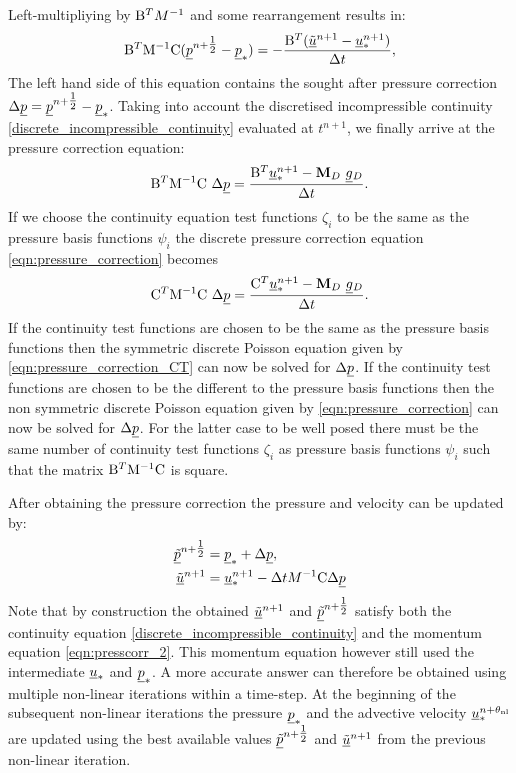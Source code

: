 Left-multipliying by $\mathrm{B}^TM^{-1}$ and
some rearrangement results in:
\begin{equation*}
  \mathrm{B}^T \mathrm{M^{-1}}\mathrm{C} ( \underline{p}^{n+\tfrac 12} -  \underline{p}_*)
  =-\frac{\mathrm{B}^T  ({\underline{\tilde u}^{n+1}-\underline{u}_*^{n+1}})}{\Delta t},
\end{equation*}
The left hand side of this equation contains the sought after pressure
correction $\Delta\underline{p}=\underline{p}^{n+\tfrac 12}-\underline{p}_*$.
Taking into account the discretised incompressible continuity
\eqref{discrete_incompressible_continuity} evaluated at
$t^{n+1}$, we finally arrive at the pressure correction equation:
\begin{equation}
 \mathrm{B}^T \mathrm{M^{-1}}\mathrm{C}~\Delta\underline{p}
   =\frac{ \mathrm{B}^T \underline{u}_*^{n+1}-{\mbox{\boldmath$\mathrm{M}$}}_D ~\underline{g}{}_D}{\Delta t}.
   \label{eqn:pressure_correction}
\end{equation}
If we choose the continuity equation test functions $\zeta_{i}$ to be the
same as the pressure basis functions $\psi_i$ the discrete pressure correction
equation \eqref{eqn:pressure_correction} becomes
\begin{equation}
 \mathrm{C}^T \mathrm{M^{-1}}\mathrm{C}~\Delta\underline{p}
   =\frac{ \mathrm{C}^T \underline{u}_*^{n+1}-{\mbox{\boldmath$\mathrm{M}$}}_D ~\underline{g}{}_D}{\Delta t}.
   \label{eqn:pressure_correction_CT}
\end{equation}
If the continuity test functions are chosen to be the same
as the pressure basis functions then the symmetric discrete Poisson equation
given by \eqref{eqn:pressure_correction_CT} can now be solved
for $\Delta\underline{p}$. If the continuity test functions are chosen to be the
different to the pressure basis functions then the non symmetric discrete Poisson equation
given by \eqref{eqn:pressure_correction} can now be solved for $\Delta\underline{p}$. For the latter
case to be well posed there must be the same number of continuity test functions $\zeta_{i}$ as
pressure basis functions $\psi_{i}$ such that the matrix $\mathrm{B}^T \mathrm{M^{-1}}\mathrm{C}$ is square.

After obtaining the pressure correction the pressure and velocity can
be updated by:
\begin{equation*}
\begin{split}
  \underline{\tilde p}^{n+\tfrac 12} &= \underline{p}_* + \Delta\underline{p}, \\
  \underline{\tilde u}^{n+1} &= \underline{u}_*^{n+1}
  -\Delta t  M^{-1} \mathrm{C} \Delta\underline{p}
\end{split}
\end{equation*}
Note that by construction the obtained $\underline{\tilde u}^{n+1}$ and
$\underline{\tilde p}^{n+\tfrac 12}$ satisfy both the continuity equation
\eqref{discrete_incompressible_continuity} and the momentum equation
\eqref{eqn:presscorr_2}. This momentum equation however still used
the intermediate $\underline{u}_*$ and $\underline{p}_*$.
A more accurate answer can therefore
be obtained using multiple non-linear iterations within a
time-step. At the beginning of the subsequent non-linear iterations
the pressure $\underline{p}_*$ and the advective velocity
$\underline{u}_*^{n+\theta_{\mathrm{nl}}}$ are updated using the best available values
$\underline{\tilde p}^{n+\tfrac 12}$ and $\underline{\tilde u}^{n+1}$ from the previous
non-linear iteration.

